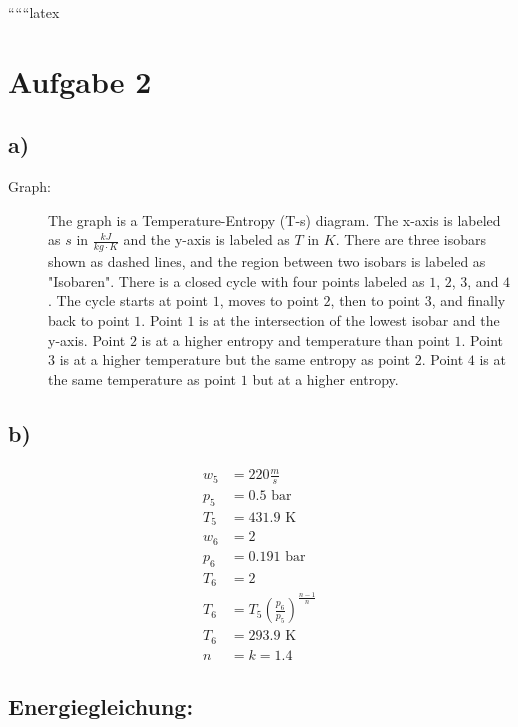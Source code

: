 
``````latex


\section*{Aufgabe 2}

\subsection*{a)}

\begin{description}
    \item[Graph:] The graph is a Temperature-Entropy (T-s) diagram. The x-axis is labeled as $s$ in $\frac{kJ}{kg \cdot K}$ and the y-axis is labeled as $T$ in $K$. There are three isobars shown as dashed lines, and the region between two isobars is labeled as "Isobaren". There is a closed cycle with four points labeled as $1$, $2$, $3$, and $4$. The cycle starts at point $1$, moves to point $2$, then to point $3$, and finally back to point $1$. Point $1$ is at the intersection of the lowest isobar and the y-axis. Point $2$ is at a higher entropy and temperature than point $1$. Point $3$ is at a higher temperature but the same entropy as point $2$. Point $4$ is at the same temperature as point $1$ but at a higher entropy.
\end{description}

\subsection*{b)}

\begin{align*}
    w_5 &= 220 \frac{m}{s} \\
    p_5 &= 0.5 \text{ bar} \\
    T_5 &= 431.9 \text{ K} \\
    w_6 &= 2 \\
    p_6 &= 0.191 \text{ bar} \\
    T_6 &= 2 \\
    T_6 &= T_5 \left( \frac{p_6}{p_5} \right)^{\frac{n-1}{n}} \\
    T_6 &= 293.9 \text{ K} \\
    n &= k = 1.4
\end{align*}

\subsection*{Energiegleichung:}

